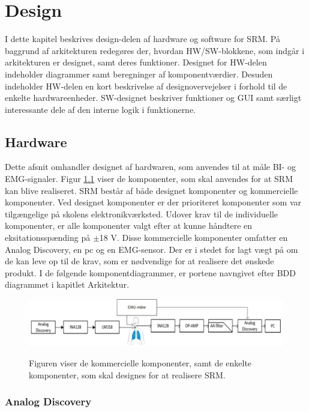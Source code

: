 \chapter{Design}

I dette kapitel beskrives design-delen af hardware og software for SRM. På baggrund af arkitekturen redegøres der, hvordan HW/SW-blokkene, som indgår i arkitekturen er designet, samt deres funktioner. Designet for HW-delen indeholder diagrammer samt beregninger af komponentværdier. Desuden indeholder HW-delen en kort
beskrivelse af designovervejelser i forhold til de enkelte hardwareenheder. SW-designet beskriver funktioner og GUI samt særligt interessante dele af den interne logik i funktionerne. 


\section{Hardware}

Dette afsnit omhandler designet af hardwaren, som anvendes til at måle  BI- og EMG-signaler. Figur \ref{fig:Blokaede} viser de komponenter, som skal anvendes for at SRM kan blive realiseret. SRM består af både designet komponenter og kommercielle komponenter. Ved designet komponenter er der prioriteret komponenter som var tilgængelige på skolens elektronikværksted. Udover krav til de individuelle komponenter, er alle komponenter valgt efter at kunne håndtere en eksitationsspænding på $\pm$18 V. Disse kommercielle komponenter omfatter en Analog Discovery, en pc og en EMG-sensor. Der er i stedet for lagt vægt på om de kan leve op til de krav, som er nødvendige for at realisere det ønskede produkt. I de følgende komponentdiagrammer, er portene navngivet efter BDD diagrammet i kapitlet Arkitektur.


\begin{figure}[H]
\centering
{\includegraphics[width=\textwidth]
{Figure/Blokaede}}
\caption{Figuren viser de kommercielle komponenter, samt de enkelte komponenter, som skal designes for at realisere SRM.}
\label{fig:Blokaede}
\end{figure}

\subsection{Analog Discovery}

